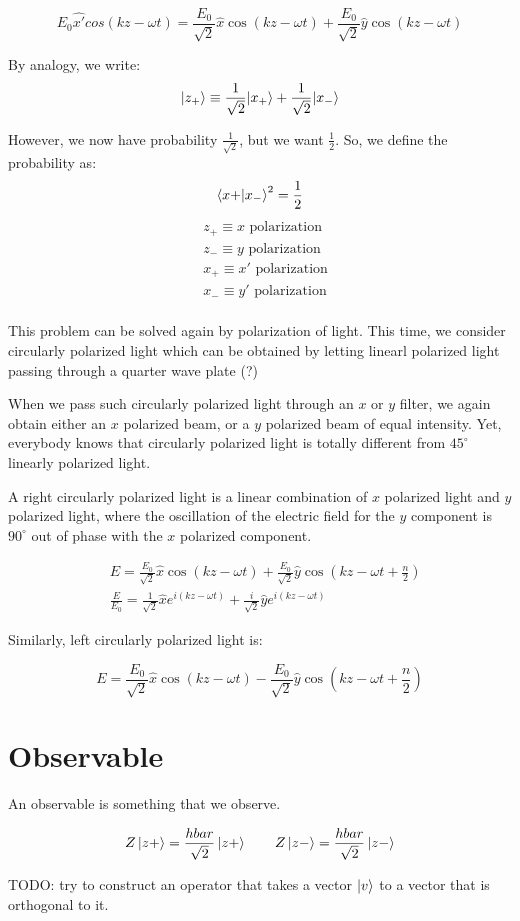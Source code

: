\[
    E_0 \hat{x'} cos (k z - \omega t) 
    = \frac{E_0}{\sqrt 2} \hat x \cos (k z - \omega t) + \frac{E_0}{\sqrt 2} \hat y \cos (k z - \omega t)
\]

By analogy, we write:
\[
    |z_+\rangle \equiv  \frac{1}{\sqrt 2} |x_+\rangle + \frac{1}{\sqrt 2} |x_-\rangle
\]

However, we now have probability $\frac{1}{\sqrt 2}$, but we want $\frac{1}{2}$.
So, we define the probability as:
\[
    \bra{x+}\ket{x_-}^2 = \frac{1}{2}
\]
\begin{align*}
    &z_+ \equiv \text{$x$ polarization} \\
    &z_- \equiv \text{$y$ polarization} \\
    &x_+ \equiv \text{$x'$ polarization} \\
    &x_- \equiv \text{$y'$ polarization} \\
\end{align*}

This problem  can be solved again by polarization of light. This time,
we consider circularly polarized light which can be obtained by letting
linearl polarized light passing through a quarter wave plate (?)

When we pass such circularly polarized light through an $x$ or $y$ filter,
we again obtain either an $x$ polarized beam, or a $y$ polarized beam
of equal intensity. Yet, everybody knows that circularly polarized light
is totally different from $45^\circ$ linearly polarized light.

A right circularly polarized light is a linear combination of $x$ polarized
light and $y$ polarized light, where the oscillation of the electric field
for the $y$ component is $90^\circ$ out of phase with the $x$ polarized component.

\begin{align*}
    &E = \frac{E_0}{\sqrt 2} \hat x \cos (k z - \omega t) + 
    \frac{E_0}{\sqrt 2} \hat y \cos (k z - \omega t + \frac{n}{2}) \\
    &\frac{E}{E_0} = \frac{1}{\sqrt 2} \hat x e^{i(kz - \omega t)} + 
        \frac{i}{\sqrt 2}\hat y e^{i (k z - \omega t)}
    \end{align*}

Similarly, left circularly polarized light is:

\[
    E = \frac{E_0}{\sqrt 2} \hat x \cos (k z - \omega t) -
    \frac{E_0}{\sqrt 2} \hat y \cos (k z - \omega t + \frac{n}{2})
\]

\section{Observable}
An observable is something that we observe.

$$
Z \ket{z+} = \frac{hbar}{\sqrt 2} \ket{z+} \qquad
Z \ket{z-} = \frac{hbar}{\sqrt 2} \ket{z-} 
$$


TODO: try to construct an operator that takes a vector $\ket{v}$ to a
vector that is orthogonal to it.
